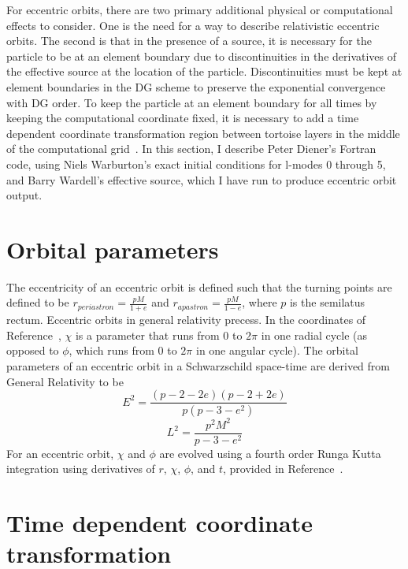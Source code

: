 For eccentric orbits, there are two primary additional physical or computational effects to consider. One is the need for a way to describe relativistic eccentric orbits. The second is that in the presence of a source, it is necessary for the particle to be at an element boundary due to discontinuities in the derivatives of the effective source at the location of the particle. Discontinuities must be kept at element boundaries in the DG scheme to preserve the exponential convergence with DG order. To keep the particle at an element boundary for all times by keeping the computational coordinate fixed, it is necessary to add a time dependent coordinate transformation region between tortoise layers in the middle of the computational grid~\cite{time_dependent_coordinate_transformation}. In this section, I describe Peter Diener's Fortran code, using Niels Warburton's exact initial conditions for l-modes 0 through 5, and Barry Wardell's effective source, which I have run to produce eccentric orbit output. 

\section{Orbital parameters}

The eccentricity of an eccentric orbit is defined such that the turning points are defined to be $r_{periastron}=\frac{pM}{1+e}$ and $r_{apastron}=\frac{pM}{1-e}$, where $p$ is the semilatus rectum. Eccentric orbits in general relativity precess. In the coordinates of Reference~\cite{pound_poisson}, $\chi$ is a parameter that runs from $0$ to $2\pi$ in one radial cycle (as opposed to $\phi$, which runs from $0$ to $2\pi$ in one angular cycle). The orbital parameters of an eccentric orbit in a Schwarzschild space-time are derived from General Relativity to be 
\begin{equation}
  E^2=\frac{(p-2-2e)(p-2+2e)}{p(p-3-e^2)}
\end{equation}
\begin{equation}
  L^2=\frac{p^2M^2}{p-3-e^2}
\end{equation}
For an eccentric orbit, $\chi$ and $\phi$ are evolved using a fourth order Runga Kutta integration using derivatives of $r$, $\chi$, $\phi$, and $t$, provided in Reference~\cite{pound_poisson}. 


\section{Time dependent coordinate transformation}

